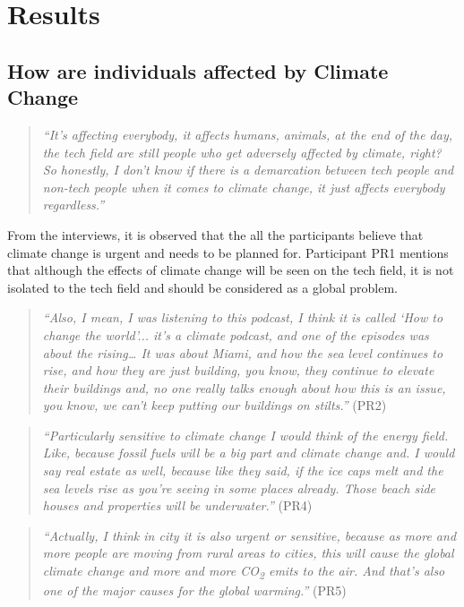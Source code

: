 \section{Results}

    \subsection{How are individuals affected by Climate Change}
    
    \begin{quote}
        \textit{“It’s affecting everybody, it affects humans, animals, at the end of the day, the tech field are still people who get adversely affected by climate, right? So honestly, I don’t know if there is a demarcation between tech people and non-tech people when it comes to climate change, it just affects everybody regardless.”}
    \end{quote}

    From the interviews, it is observed that the all the participants believe that climate change is urgent and needs to be planned for. Participant PR1 mentions that although the effects of climate change will be seen on the tech field, it is not isolated to the tech field and should be considered as a global problem.
    
    \begin{quote}
        \textit{“Also, I mean, I was listening to this podcast, I think it is called `How to change the world'... it’s a climate podcast, and one of the episodes was about the rising… It was about Miami, and how the sea level continues to rise, and how they are just building, you know, they continue to elevate their buildings and, no one really talks enough about how this is an issue, you know, we can’t keep putting our buildings on stilts.”} (PR2)
    \end{quote}
    
    \begin{quote}
        \textit{“Particularly sensitive to climate change I would think of the energy field. Like, because fossil fuels will be a big part and climate change and. I would say real estate as well, because like they said, if the ice caps melt and the sea levels rise as you're seeing in some places already. Those beach side houses and properties will be underwater.”} (PR4)
    \end{quote}

    \begin{quote}
        \textit{“Actually, I think in city it is also urgent or sensitive, because as more and more people are moving from rural areas to cities, this will cause the global climate change and more and more CO\textsubscript{2} emits to the air. And that’s also one of the major causes for the global warming.”} (PR5)
    \end{quote}
    
